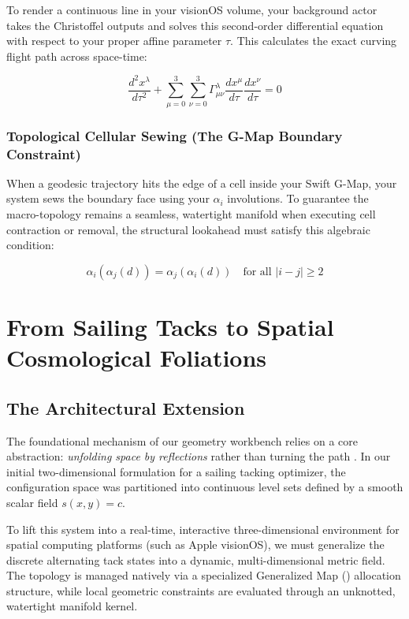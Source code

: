 To render a continuous line in your visionOS volume, your background actor takes the Christoffel outputs and solves this second-order differential equation with respect to your proper affine parameter \(\tau \). This calculates the exact curving flight path across space-time:

\[
\frac{d^2 x^\lambda}{d\tau^2} + \sum_{\mu=0}^{3} \sum_{\nu=0}^{3} \Gamma^\lambda_{\mu\nu} \frac{dx^\mu}{d\tau} \frac{dx^\nu}{d\tau} = 0
\]


\subsection{Topological Cellular Sewing (The G-Map Boundary Constraint)}

When a geodesic trajectory hits the edge of a cell inside your Swift G-Map, your system sews the boundary face using your \(\alpha _{i}\) involutions. To guarantee the macro-topology remains a seamless, watertight manifold when executing cell contraction or removal, the structural lookahead must satisfy this algebraic condition:


\[
\alpha_i(\alpha_j(d)) = \alpha_j(\alpha_i(d)) \quad \text{for all } |i - j| \ge 2
\]



\chapter{From Sailing Tacks to Spatial Cosmological Foliations}
\label{ch:sailing_to_cosmology}

\section{The Architectural Extension}
The foundational mechanism of our geometry workbench relies on a core abstraction: \textit{unfolding space by reflections} rather than turning the path \cite{damiand2014}. In our initial two-dimensional formulation for a sailing tacking optimizer, the configuration space was partitioned into continuous level sets defined by a smooth scalar field $s(x,y) = c$. 

To lift this system into a real-time, interactive three-dimensional environment for spatial computing platforms (such as Apple visionOS), we must generalize the discrete alternating tack states into a dynamic, multi-dimensional metric field. The topology is managed natively via a specialized Generalized Map (\GMap) allocation structure, while local geometric constraints are evaluated through an unknotted, watertight manifold kernel.

